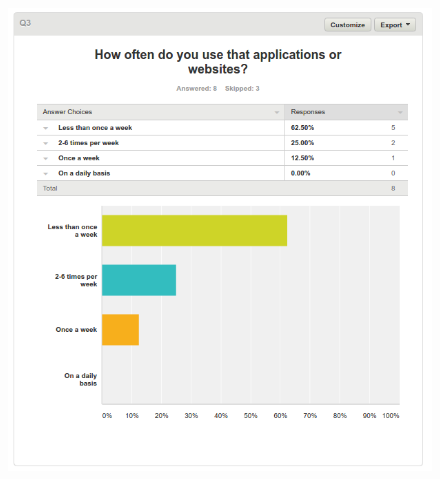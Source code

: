 \begin{figure}[H]
\begin{adjustbox}{width=1\textwidth,center=\textwidth}
  \centering
  \includegraphics[scale=1]{surveys/q3.png}
\end{adjustbox}
\end{figure}
